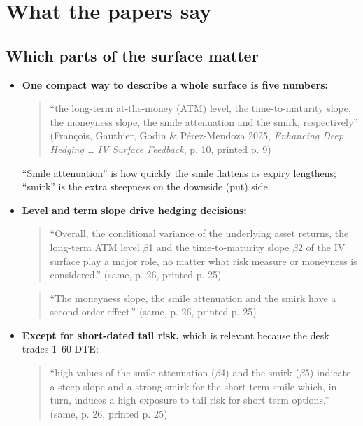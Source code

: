 \documentclass{article}
\begin{document}
\section{What the papers say}

\subsection{Which parts of the surface matter}

\begin{itemize}

\item \textbf{One compact way to describe a whole surface is five numbers:}

\begin{quote}``the long-term at-the-money (ATM) level, the time-to-maturity slope, the moneyness slope, the smile attenuation and the smirk, respectively'' (François, Gauthier, Godin \& Pérez-Mendoza 2025, \emph{Enhancing Deep Hedging \ldots{} IV Surface Feedback}, p. 10, printed p. 9)\end{quote}

``Smile attenuation'' is how quickly the smile flattens as expiry lengthens; ``smirk'' is the extra steepness on the downside (put) side.

\item \textbf{Level and term slope drive hedging decisions:}

\begin{quote}``Overall, the conditional variance of the underlying asset returns, the long-term ATM level \ensuremath{\beta}1 and the time-to-maturity slope \ensuremath{\beta}2 of the IV surface play a major role, no matter what risk measure or moneyness is considered.'' (same, p. 26, printed p. 25)\end{quote}

\begin{quote}``The moneyness slope, the smile attenuation and the smirk have a second order effect.'' (same, p. 26, printed p. 25)\end{quote}

\item \textbf{Except for short-dated tail risk,} which is relevant because the desk trades 1--60 DTE:

\begin{quote}``high values of the smile attenuation (\ensuremath{\beta}4) and the smirk (\ensuremath{\beta}5) indicate a steep slope and a strong smirk for the short term smile which, in turn, induces a high exposure to tail risk for short term options.'' (same, p. 26, printed p. 25)\end{quote}

\end{itemize}
\end{document}

